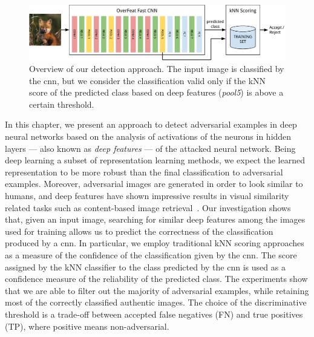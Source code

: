 \begin{figure}
\centering
\includegraphics[width=\linewidth]{overview}
\caption{Overview of our detection approach. The input image is classified by the \gls{cnn}, but we consider the classification valid only if the kNN score of the predicted class based on deep features (\emph{pool5}) is above a certain threshold.}
\label{fig:adv:overview}
\end{figure}

In this chapter, we present an approach to detect adversarial examples in deep neural networks based on the analysis of activations of the neurons in hidden layers --- also known as \emph{deep features} --- of the attacked neural network.
Being deep learning a subset of representation learning methods, we expect the learned representation to be more robust than the final classification to adversarial examples.
Moreover, adversarial images are generated in order to look similar to humans, and deep features have shown impressive results in visual similarity related tasks such as content-based image retrieval~\cite{sharif2014cnn,gordo2016deep}.
Our investigation shows that, given an input image, searching for similar deep features among the images used for training allows us to predict the correctness of the classification produced by a \gls{cnn}.
In particular, we employ traditional kNN scoring approaches as a measure of the confidence of the classification given by the \gls{cnn}.
The score assigned by the kNN classifier to the class predicted by the \gls{cnn} is used as a confidence measure of the reliability of the predicted class.
The experiments show that we are able to filter out the majority of adversarial examples, while retaining most of the correctly classified authentic images.
The choice of the discriminative threshold is a trade-off between accepted false negatives (FN) and true positives (TP), where positive means non-adversarial.
